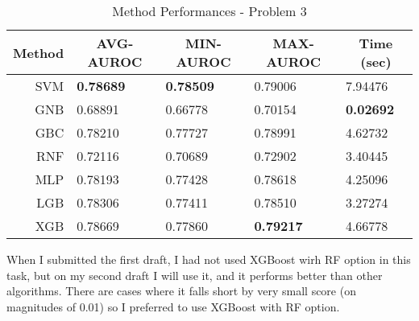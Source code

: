 \documentclass[11pt,reqno]{amsart}
\begin{document}
\begin{table}[h]
\begin{tabular}{|c|l|l|l|l|}
\hline
Method & \multicolumn{1}{c|}{AVG-AUROC} & \multicolumn{1}{c|}{MIN-AUROC} & \multicolumn{1}{c|}{MAX-AUROC} & \multicolumn{1}{c|}{Time (sec)} \\ \hline
\multicolumn{1}{|r|}{SVM} & \textbf{0.78689} & \textbf{0.78509} & 0.79006 & 7.94476 \\ \hline
\multicolumn{1}{|r|}{GNB} & 0.68891 & 0.66778 & 0.70154 &\textbf{0.02692} \\ \hline
\multicolumn{1}{|r|}{GBC} & 0.78210 & 0.77727 & 0.78991 & 4.62732 \\ \hline
\multicolumn{1}{|r|}{RNF} & 0.72116 & 0.70689 & 0.72902 & 3.40445 \\ \hline
\multicolumn{1}{|r|}{MLP} & 0.78193 & 0.77428 & 0.78618 & 4.25096 \\ \hline
\multicolumn{1}{|r|}{LGB} & 0.78306 & 0.77411 & 0.78510 & 3.27274 \\ \hline
\multicolumn{1}{|r|}{XGB} & 0.78669 & 0.77860 & \textbf{0.79217} & 4.66778 \\ \hline
\end{tabular}
\caption{Method Performances - Problem 3}
\label{tab:perf3}
\end{table}

When I submitted the first draft, I had not used XGBoost wirh RF option in this task, but on my second draft I will use it, and it performs better than other algorithms. There are cases where it falls short by very small score (on magnitudes of 0.01) so I preferred to use XGBoost with RF option.
\end{document}

